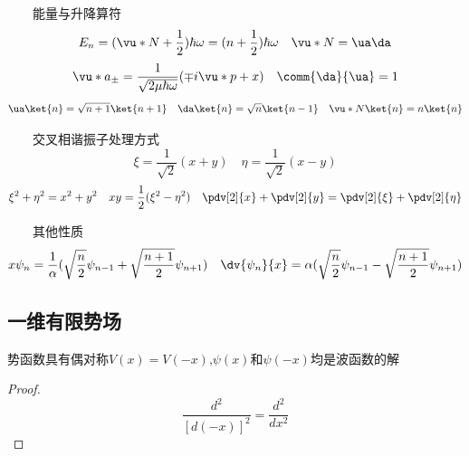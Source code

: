 \begin{formal}
\begin{enumerate}
                $\qquad$能量与升降算符
                $$ E_{n} = (\vu*{N} + \frac{1}{2}) \hbar \omega = (n + \frac{1}{2}) \hbar \omega   \quad  \vu*{N} = \ua \da   $$
                $$ \vu*{a}_{\pm} = \frac{1}{\sqrt{2\mu \hbar \omega}} (\mp i\vu*{p} + x) \quad \comm{\da}{\ua} = 1 $$
                $$ \ua \ket{n} = \sqrt{n+1}\ket{n+1} \quad \da\ket{n} = \sqrt{n}\ket{n-1} \quad \vu*{N}\ket{n} = n \ket{n}$$
                
                $\qquad$交叉相谐振子处理方式
                $$ \xi = \frac{1}{\sqrt{2}} (x+y) \quad \eta = \frac{1}{\sqrt{2}} (x -y)  $$
                $$ \xi^{2} + \eta^{2} = x^{2} + y^{2} \quad xy = \frac{1}{2} (\xi^{2} - \eta^{2}) \quad \pdv[2]{x} + \pdv[2]{y} = \pdv[2]{\xi} + \pdv[2]{\eta}$$
                
                $\qquad$其他性质
                $$  
                x \psi_{n} = \frac{1}{\alpha}(\sqrt{\frac{n}{2}}\psi_{n-1} + \sqrt{\frac{n+1}{2}} \psi_{n+1})  \quad 
                \dv{\psi_{n}}{x} = \alpha (\sqrt{\frac{n}{2}}\psi_{n-1} - \sqrt{\frac{n+1}{2}} \psi_{n+1}) 
                $$



                
                

                
            \end{enumerate}
        \end{formal}

        \subsection{一维有限势场}
        \begin{thm}\label{thm:1.1}                                                %
            势函数具有偶对称$V(x)=V(-x)$,$\psi(x)$和$\psi(-x)$均是波函数的解
            
            \begin{proof}
                
                $$ \frac{d^2}{[d(-x)]^2}=\frac{d^2}{dx^2} $$ 

            \end{proof}
        
        \end{thm}
    

